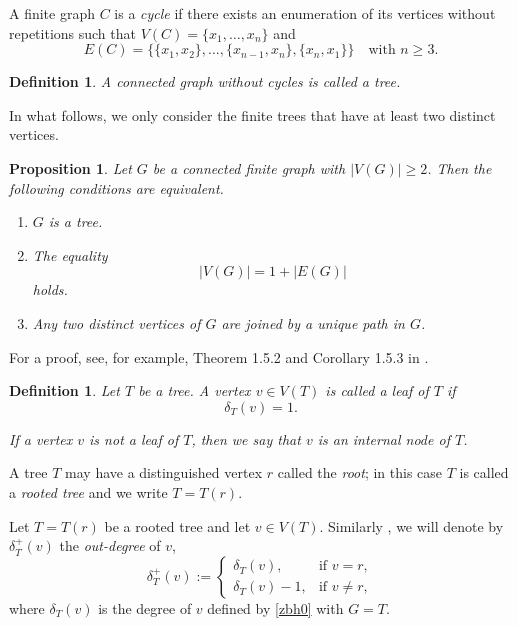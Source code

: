 \documentclass[pdflatex,sn-mathphys-num]{sn-jnl}%
\theoremstyle{thmstyleone}%
\newtheorem{Proposition}[Theorem]{Proposition}
\theoremstyle{thmstyletwo}%
\theoremstyle{thmstylethree}%
\newtheorem{Definition}[Theorem]{Definition}
\theoremstyle{thmstyletwo}%
\theoremstyle{thmstylethree}%
\begin{document}
A finite graph $C$ is a \textit{cycle} if there exists an enumeration of its vertices without repetitions such that $V(C) = \{x_1, \ldots, x_n\}$ and
\begin{equation*}
E(C) = \{\{x_1, x_2\}, \ldots, \{x_{n-1}, x_n\}, \{x_n, x_1\}\} \quad \text{with } n \geq 3.
\end{equation*}





\begin{Definition}\label{szaskk}
A connected graph  without cycles is called a \textit{tree}. 
\end{Definition}


In what follows, we only consider the finite trees that have at least two distinct vertices.








\begin{Proposition}
\label{jgds}
Let $G$ be a connected finite graph with $|V(G)|\geq 2$. Then the following conditions are equivalent.
\begin{enumerate}
    \item[(i)] $G$ is a tree.

        \item[(ii)] The equality 
\begin{equation*}
    |V(G)|=1+|E(G)|
\end{equation*}
holds.

            \item[(iii)] Any two distinct vertices of $G$ are joined by a unique path in $G$.
\end{enumerate}
\end{Proposition}
For a proof, see, for example, Theorem 1.5.2 and Corollary 1.5.3 in \cite{Diestel2017}.

\begin{Definition}
    \label{rguij}
Let $T$ be a tree. A vertex $v\in V(T)$  is  called a {\it leaf}  of $T$ if 
\[
\delta_T(v)=1.
\]

If a vertex $v$ is not a leaf of $T$, then we say that $v$ is an {\it internal node} of $T$.
\end{Definition}




A tree $T$ may have a distinguished vertex $r$ called the {\it root}; in this case $T$ is called a {\it rooted tree} and we write $T=T(r)$.

Let $T=T(r)$ be a rooted tree and let $v\in V(T)$. Similarly \cite{Dov2019pNUAA,DP2018pNUAA,DP2019PNUAA,DP2020pNUAA,DPT2015,DPT2017FPTA}, we will denote by $\delta_T^{+}(v)$ the {\it out-degree} of $v$,
\begin{equation}
    \label{zbh1}
\delta_T^{+}(v):=
\begin{cases}
\delta_T(v), & \text{if } v=r,\\
\delta_T(v)-1, & \text{if } v\ne r,
\end{cases}
\end{equation}
where $\delta_T(v)$ is the degree of $v$ defined by \eqref{zbh0} with $G=T$.
\end{document}
